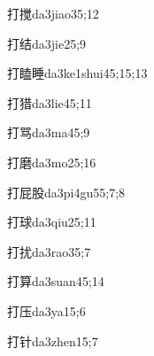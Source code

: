 \begin{verbete}{打搅}{da3jiao3}{5;12}
\end{verbete}

\begin{verbete}{打结}{da3jie2}{5;9}
\end{verbete}

\begin{verbete}{打瞌睡}{da3ke1shui4}{5;15;13}
\end{verbete}

\begin{verbete}{打猎}{da3lie4}{5;11}
\end{verbete}

\begin{verbete}{打骂}{da3ma4}{5;9}
\end{verbete}

\begin{verbete}{打磨}{da3mo2}{5;16}
\end{verbete}

\begin{verbete}{打屁股}{da3pi4gu5}{5;7;8}
\end{verbete}

\begin{verbete}{打球}{da3qiu2}{5;11}
\end{verbete}

\begin{verbete}{打扰}{da3rao3}{5;7}
\end{verbete}

\begin{verbete}{打算}{da3suan4}{5;14}
\end{verbete}

\begin{verbete}{打压}{da3ya1}{5;6}
\end{verbete}

\begin{verbete}{打针}{da3zhen1}{5;7}
\end{verbete}

